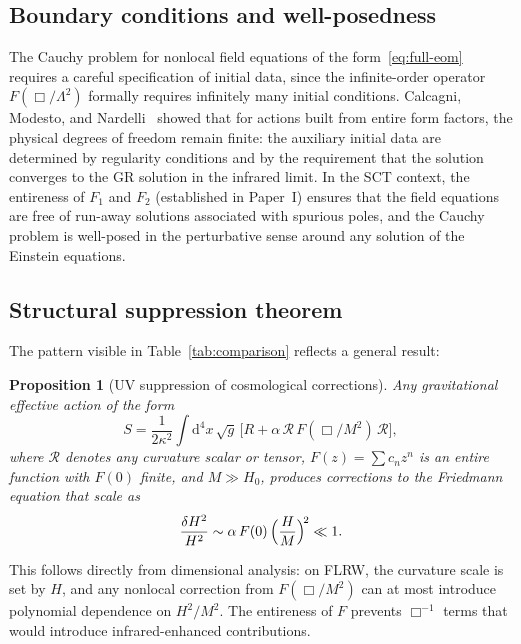 \documentclass[12pt,a4paper]{article}
\newcommand{\dd}{\mathrm{d}}
\newcommand{\Lam}{\Lambda}
\theoremstyle{plain}
\newtheorem{proposition}[theorem]{Proposition}
\theoremstyle{definition}
\begin{document}
\subsection{Boundary conditions and well-posedness}

The Cauchy problem for nonlocal field equations of the form~\eqref{eq:full-eom}
requires a careful specification of initial data, since the infinite-order
operator $F(\Box/\Lam^2)$ formally requires infinitely many initial
conditions.  Calcagni, Modesto, and Nardelli~\cite{Calcagni:2018gke}
showed that for actions built from entire form factors, the physical
degrees of freedom remain finite: the auxiliary initial data are
determined by regularity conditions and by the requirement that the
solution converges to the GR solution in the infrared limit.  In the SCT
context, the entireness of $F_1$ and $F_2$ (established in Paper~I)
ensures that the field equations are free of run-away solutions associated
with spurious poles, and the Cauchy problem is well-posed in the
perturbative sense around any solution of the Einstein equations.

\subsection{Structural suppression theorem}

The pattern visible in Table~\ref{tab:comparison} reflects a general
result:

\begin{proposition}[UV suppression of cosmological corrections]
\label{prop:UV-suppression}
Any gravitational effective action of the form
\begin{equation}\label{eq:generic-NLG}
  S = \frac{1}{2\kappa^2}\int\dd^4x\,\sqrt{g}\,
  \bigl[R + \alpha\,\mathcal{R}\,F(\Box/M^2)\,\mathcal{R}\bigr],
\end{equation}
where $\mathcal{R}$ denotes any curvature scalar or tensor,
$F(z) = \sum c_n z^n$ is an entire function with $F(0)$ finite, and
$M \gg H_0$, produces corrections to the Friedmann equation that scale as
\begin{equation}\label{eq:UV-scaling}
  \frac{\delta H^2}{H^2} \sim \alpha\,F(0)\,
  \Bigl(\frac{H}{M}\Bigr)^{\!2} \ll 1.
\end{equation}
\end{proposition}

\noindent
This follows directly from dimensional analysis: on FLRW, the curvature
scale is set by $H$, and any nonlocal correction from $F(\Box/M^2)$ can at
most introduce polynomial dependence on $H^2/M^2$.  The entireness of $F$
prevents $\Box^{-1}$ terms that would introduce infrared-enhanced
contributions.
\end{document}
